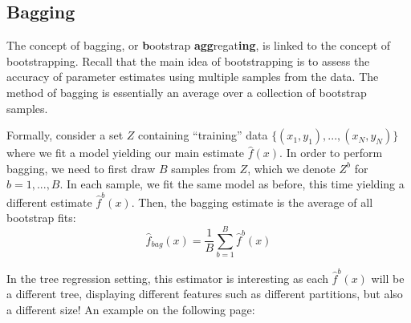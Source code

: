 \documentclass[12pt]{report}
\begin{document}
\subsection{Bagging}

The concept of bagging, or \textbf{b}ootstrap \textbf{agg}regat\textbf{ing}, is linked to the concept of bootstrapping. Recall that the main idea of bootstrapping is to assess the accuracy of parameter estimates using multiple samples from the data. The method of bagging is essentially an average over a collection of bootstrap samples. 

Formally, consider a set $Z$ containing ``training'' data $\{(x_1, y_1), ..., (x_N,y_N)\}$ where we fit a model yielding our main estimate $\hat f(x)$. In order to perform bagging, we need to first draw $B$ samples from $Z$, which we denote $Z^b$ for $b=1, ..., B$. In each sample, we fit the same model as before, this time yielding a different estimate $\hat f^b(x)$. Then, the bagging estimate is the average of all bootstrap fits: $$\hat f_{bag}(x) = \frac{1}{B}\sum_{b=1}^{B} \hat f^b(x)$$

In the tree regression setting, this estimator is interesting as each $\hat f^b(x)$ will be a different tree, displaying different features such as different partitions, but also a different size! An example on the following page:
\end{document}
